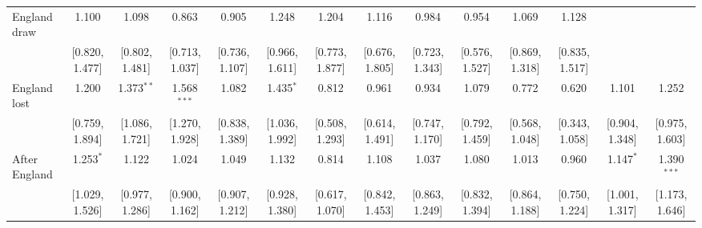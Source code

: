 \documentclass[12pt, a4paper]{article}
\begin{document}
\begin{table}
{\begin{threeparttable}
\begin{tabular}{@{\extracolsep{1pt}}lccccccccccccc}
  England draw & 1.100 & 1.098 & 0.863 & 0.905 & 1.248 & 1.204 & 1.116 & 0.984 & 0.954 & 1.069 & 1.128 &  &  \\ 
  & [0.820, 1.477] & [0.802, 1.481] & [0.713, 1.037] & [0.736, 1.107] & [0.966, 1.611] & [0.773, 1.877] & [0.676, 1.805] & [0.723, 1.343] & [0.576, 1.527] & [0.869, 1.318] & [0.835, 1.517] &  &  \\ 
  England lost & 1.200 & 1.373$^{**}$ & 1.568$^{***}$ & 1.082 & 1.435$^{*}$ & 0.812 & 0.961 & 0.934 & 1.079 & 0.772 & 0.620 & 1.101 & 1.252 \\ 
  & [0.759, 1.894] & [1.086, 1.721] & [1.270, 1.928] & [0.838, 1.389] & [1.036, 1.992] & [0.508, 1.293] & [0.614, 1.491] & [0.747, 1.170] & [0.792, 1.459] & [0.568, 1.048] & [0.343, 1.058] & [0.904, 1.348] & [0.975, 1.603] \\ 
  After England & 1.253$^{*}$ & 1.122 & 1.024 & 1.049 & 1.132 & 0.814 & 1.108 & 1.037 & 1.080 & 1.013 & 0.960 & 1.147$^{*}$ & 1.390$^{***}$ \\ 
  & [1.029, 1.526] & [0.977, 1.286] & [0.900, 1.162] & [0.907, 1.212] & [0.928, 1.380] & [0.617, 1.070] & [0.842, 1.453] & [0.863, 1.249] & [0.832, 1.394] & [0.864, 1.188] & [0.750, 1.224] & [1.001, 1.317] & [1.173, 1.646] \\


\end{tabular}
\end{threeparttable}}
\end{table}
\end{document}
